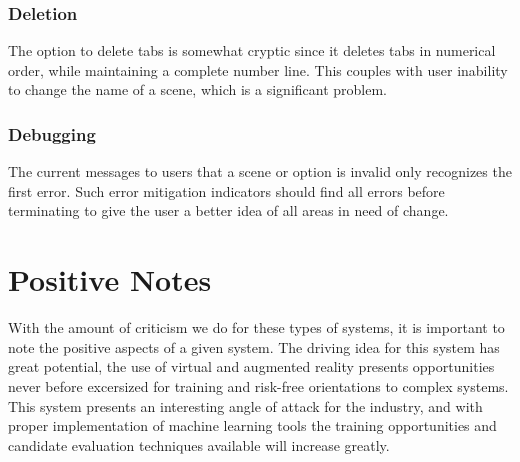 \documentclass[sigconf, anonymous]{acmart} %
\begin{document}
\subsubsection{Deletion}
The option to delete tabs is somewhat cryptic since it deletes tabs in numerical order, while maintaining a complete number line. This couples with user inability to change the name of a scene, which is a significant problem.

\subsubsection{Debugging}
The current messages to users that a scene or option is invalid only recognizes the first error. Such error mitigation indicators should find all errors before terminating to give the user a better idea of all areas in need of change.

\section{Positive Notes}
With the amount of criticism we do for these types of systems, it is important to note the positive aspects of a given system. The driving idea for this system has great potential, the use of virtual and augmented reality presents opportunities never before excersized for training and risk-free orientations to complex systems. This system presents an interesting angle of attack for the industry, and with proper implementation of machine learning tools the training opportunities and candidate evaluation techniques available will increase greatly.
\end{document}
